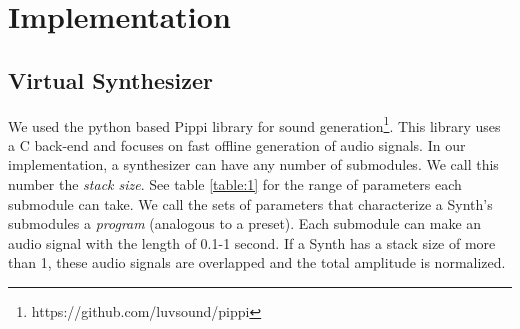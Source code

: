 \documentclass{nime-alternate} %
\begin{document}
\section{Implementation}
\label{impl}


\subsection{Virtual Synthesizer}
We used the python based Pippi library for sound generation\footnote{https://github.com/luvsound/pippi}. This library uses a C back-end and focuses on fast offline generation of audio signals. In our implementation, a synthesizer can have any number of submodules. We call this number the \textit{stack size}. See table \ref{table:1} for the range of parameters each submodule can take. We call the sets of parameters that characterize a Synth's submodules a \textit{program} (analogous to a preset).  Each submodule can make an audio signal with the length of 0.1-1 second. If a Synth has a stack size of more than 1, these audio signals are overlapped and the total amplitude is normalized.\\
\end{document}

